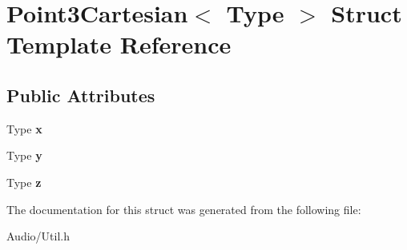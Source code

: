 \hypertarget{struct_point3_cartesian}{}\section{Point3\+Cartesian$<$ Type $>$ Struct Template Reference}
\label{struct_point3_cartesian}
\subsection*{Public Attributes}
\begin{DoxyCompactItemize}
\item 
\mbox{\label{struct_point3_cartesian_a8a7c1ca39a314d571482eccffc9b6ab9}} 
Type {\bfseries x}
\item 
\mbox{\label{struct_point3_cartesian_aea105586de55cb0a0804eca96db62924}} 
Type {\bfseries y}
\item 
\mbox{\label{struct_point3_cartesian_a7c73c1d126727844f8118ce79ff5c1dc}} 
Type {\bfseries z}
\end{DoxyCompactItemize}


The documentation for this struct was generated from the following file\+:\begin{DoxyCompactItemize}
\item 
Audio/Util.\+h\end{DoxyCompactItemize}
